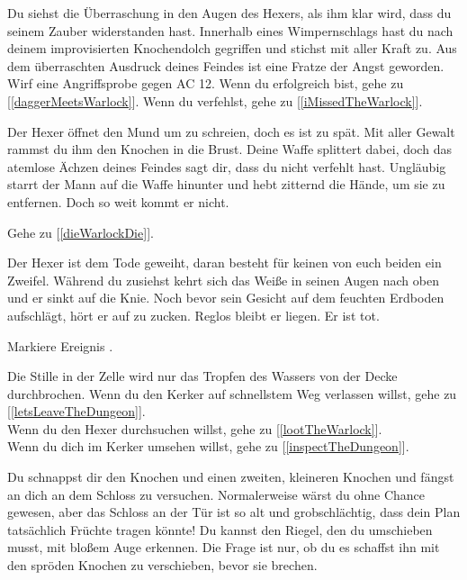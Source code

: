 
Du siehst die Überraschung in den Augen des Hexers, als ihm klar wird, dass du seinem Zauber widerstanden hast. Innerhalb eines Wimpernschlags hast du nach deinem improvisierten Knochendolch gegriffen und stichst mit aller Kraft zu. Aus dem überraschten Ausdruck deines Feindes ist eine Fratze der Angst geworden.
Wirf eine Angriffsprobe gegen AC 12. Wenn du erfolgreich bist, gehe zu [\ref{daggerMeetsWarlock}]. Wenn du verfehlst, gehe zu [\ref{iMissedTheWarlock}].


Der Hexer öffnet den Mund um zu schreien, doch es ist zu spät. Mit aller Gewalt rammst du ihm den Knochen in die Brust. Deine Waffe splittert dabei, doch das atemlose Ächzen deines Feindes sagt dir, dass du nicht verfehlt hast. Ungläubig starrt der Mann auf die Waffe hinunter und hebt zitternd die Hände, um sie zu entfernen. Doch so weit kommt er nicht.

Gehe zu [\ref{dieWarlockDie}].


Der Hexer ist dem Tode geweiht, daran besteht für keinen von euch beiden ein Zweifel. Während du zusiehst kehrt sich das Weiße in seinen Augen nach oben und er sinkt auf die Knie. Noch bevor sein Gesicht auf dem feuchten Erdboden aufschlägt, hört er auf zu zucken. Reglos bleibt er liegen. Er ist tot.

Markiere Ereignis .

Die Stille in der Zelle wird nur das Tropfen des Wassers von der Decke durchbrochen. Wenn du den Kerker auf schnellstem Weg verlassen willst, gehe zu [\ref{letsLeaveTheDungeon}].
\\Wenn du den Hexer durchsuchen willst, gehe zu [\ref{lootTheWarlock}].
\\Wenn du dich im Kerker umsehen willst, gehe zu [\ref{inspectTheDungeon}].


Du schnappst dir den Knochen und einen zweiten, kleineren Knochen und fängst an dich an dem Schloss zu versuchen. Normalerweise wärst du ohne Chance gewesen, aber das Schloss an der Tür ist so alt und grobschlächtig, dass dein Plan tatsächlich Früchte tragen könnte! Du kannst den Riegel, den du umschieben musst, mit bloßem Auge erkennen. Die Frage ist nur, ob du es schaffst ihn mit den spröden Knochen zu verschieben, bevor sie brechen.

